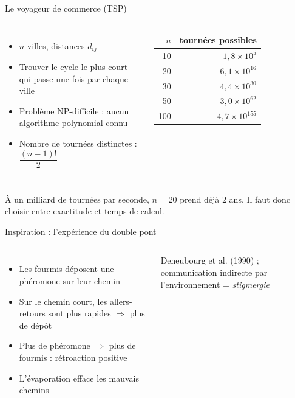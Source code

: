 \documentclass[aspectratio=169,11pt]{beamer}
\begin{document}
\begin{frame}{Le voyageur de commerce (TSP)}
  \begin{columns}[c]
    \begin{itemize}
      \item $n$ villes, distances $d_{ij}$
      \item Trouver le \alert{cycle le plus court} qui passe une fois par chaque ville
      \item Problème \alert{NP-difficile} : aucun algorithme polynomial connu
      \item Nombre de tournées distinctes : $\dfrac{(n-1)!}{2}$
    \end{itemize}
    \centering
    \begin{tabular}{rr}
      \toprule
      $n$ & tournées possibles \\
      \midrule
      10  & $1{,}8 \times 10^{5}$ \\
      20  & $6{,}1 \times 10^{16}$ \\
      30  & $4{,}4 \times 10^{30}$ \\
      50  & $3{,}0 \times 10^{62}$ \\
      100 & $4{,}7 \times 10^{155}$ \\
      \bottomrule
    \end{tabular}
  \end{columns}
  \vspace{0.8em}
  \small À un milliard de tournées par seconde, $n = 20$ prend déjà \alert{2 ans}.
  Il faut donc choisir entre \alert{exactitude} et \alert{temps de calcul}.
\end{frame}

\begin{frame}{Inspiration : l'expérience du double pont}
  \begin{columns}[c]
    \centering
    \begin{itemize}
      \item Les fourmis déposent une \alert{phéromone} sur leur chemin
      \item Sur le chemin court, les allers-retours sont plus rapides
            $\Rightarrow$ plus de dépôt
      \item Plus de phéromone $\Rightarrow$ plus de fourmis : \alert{rétroaction positive}
      \item L'évaporation efface les mauvais chemins
    \end{itemize}
    \small Deneubourg et al. (1990) ; communication indirecte par l'environnement = \emph{stigmergie}
  \end{columns}
\end{frame}
\end{document}
